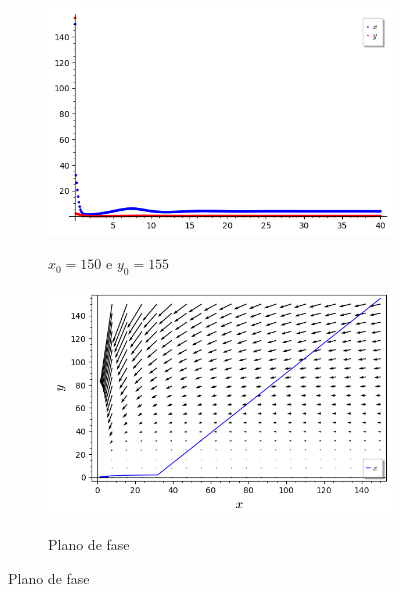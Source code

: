 \begin{figure}[H]
    \centering
    \begin{subfigure}{0.4\textwidth}
        \includegraphics[scale=0.48]{figuras/HT_15.png}
        \label{fig:HT_15}
        \caption{$x_0 = 150$ e $y_0 = 155$}
    \end{subfigure}
    \begin{subfigure}{0.4\textwidth}
        \includegraphics[scale=0.48]{figuras/HT_16.png}
        \label{fig:HT_16}
        \caption{Plano de fase}
    \end{subfigure}
\end{figure}

